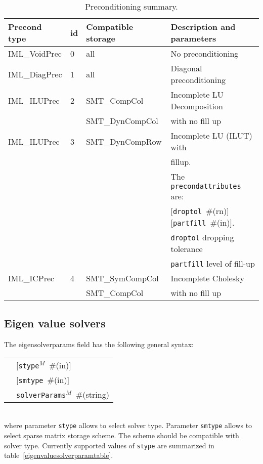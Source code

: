 \documentclass[a4paper]{article}
\makeatletter
\newcommand{\param}[1]{\texttt{#1}} %
\newcommand{\optional}[1]{[#1]} %
\newcommand{\field}[2]{\param{#1}~\#{\tiny(#2)}} %
\newcommand{\optField}[2]{\optional{\field{#1}{#2}}}
\newenvironment{record}[1][]{\begin{tabular}{|ll}}{\end{tabular}\\}
\newcommand{\recentry}[2]{{#1}&{#2}\\}
\newcounter{rcc}
\newenvironment{record}[1][\textwidth]{\setcounter{rcc}{0}\begin{tabular*}{#1}{|ll@{\extracolsep{\fill}}r}}{\end{tabular*}\\}
\newcommand{\recentry}[2]{\ifthenelse{\value{rcc}>0}{&$\backslash$ \\}{\setcounter{rcc}{1}}{#1}&{#2}}
\makeatother
\begin{document}
\begin{table}[ht]
\begin{center}
\begin{tabular}{|l|l|l|l|}
\hline
Precond type & id & Compatible storage & Description and parameters \\
\hline\hline
IML\_VoidPrec &0& all & No preconditioning\\
\hline
IML\_DiagPrec &1& all & Diagonal preconditioning\\
\hline
IML\_ILUPrec  &2& SMT\_CompCol & Incomplete LU Decomposition\\
              & & SMT\_DynCompCol&with no fill up\\
\hline
IML\_ILUPrec  &3& SMT\_DynCompRow & Incomplete LU (ILUT) with\\
              & &                 &  fillup. \\
              & &                 & The \param{precondattributes} are:\\
              & &                 & \optField{droptol}{rn} \optField{partfill}{in}.\\
              & &                 & \param{droptol} dropping tolerance\\
              & &                 & \param{partfill} level of fill-up\\
\hline
IML\_ICPrec   &4& SMT\_SymCompCol&Incomplete Cholesky\\
              & & SMT\_CompCol   &with no fill up\\
\hline
\end{tabular}
\caption{Preconditioning summary.}
\label{precondtable}
\end{center}
\end{table}

\subsection{Eigen value solvers}
\label{eigensolverssection}
The eigensolverparams field has the following general syntax:\\
\begin{record}
  \recentry{\hspace{20mm}}{\optField{stype$^M$}{in}}
  \recentry{}{\optField{smtype}{in}}
  \recentry{}{\field{solverParams$^M$}{string}}
\end{record}
where parameter \param{stype} allows to select solver type. Parameter \param{smtype} allows to select sparse matrix storage
scheme. The scheme should be compatible with solver type. Currently supported values of \param{stype} are summarized in table~\ref{eigenvaluesolverparamtable}.
\end{document}
